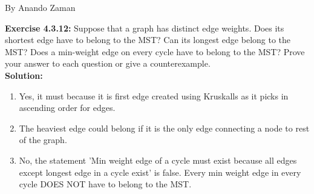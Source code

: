 \documentclass[11pt,fleqn]{article}
\newcommand{\be}{\begin{enumerate}}
\newcommand{\ee}{\end{enumerate}}
\begin{document}
By Anando Zaman


\textbf{Exercise 4.3.12:} Suppose that a graph has distinct edge weights. Does its shortest edge have to
belong to the MST? Can its longest edge belong to the MST? Does a min-weight edge
on every cycle have to belong to the MST? Prove your answer to each question or give
a counterexample.\\

\textbf{Solution:}
\be
	\item Yes, it must because it is first edge created using Kruskalls as it picks in ascending order for edges.
	
	\item The heaviest edge could belong if it is the only edge connecting a node to rest of the graph.
	
	\item No, the statement 'Min weight edge of a cycle must exist because all edges except longest edge in a cycle exist' is false. Every min weight edge in every cycle DOES NOT have to belong to the MST.
\ee


	
\end{document}
